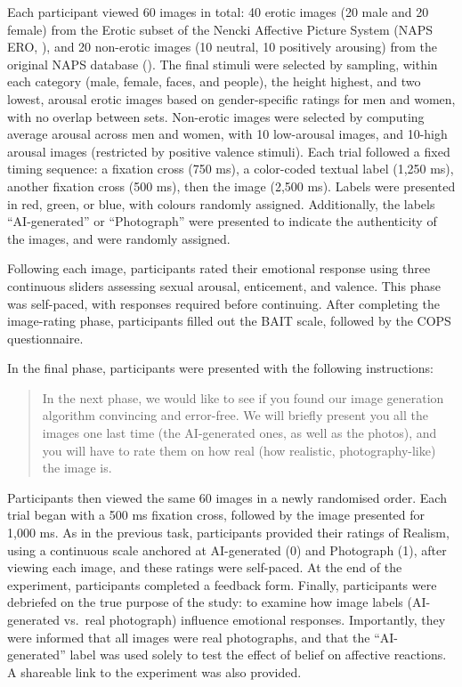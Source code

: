 \documentclass[
  jou,
  floatsintext,
  longtable,
  nolmodern,
  notxfonts,
  notimes,
  colorlinks=true,linkcolor=blue,citecolor=blue,urlcolor=blue]{apa7}
\begin{document}
Each participant viewed 60 images in total: 40 erotic images (20 male
and 20 female) from the Erotic subset of the Nencki Affective Picture
System (NAPS ERO, ), and 20 non-erotic images (10 neutral, 10 positively arousing)
from the original NAPS database
(). The final
stimuli were selected by sampling, within each category (male, female,
faces, and people), the height highest, and two lowest, arousal erotic
images based on gender-specific ratings for men and women, with no
overlap between sets. Non-erotic images were selected by computing
average arousal across men and women, with 10 low-arousal images, and
10-high arousal images (restricted by positive valence stimuli). Each
trial followed a fixed timing sequence: a fixation cross (750 ms), a
color-coded textual label (1,250 ms), another fixation cross (500 ms),
then the image (2,500 ms). Labels were presented in red, green, or blue,
with colours randomly assigned. Additionally, the labels
``AI-generated'' or ``Photograph'' were presented to indicate the
authenticity of the images, and were randomly assigned.

Following each image, participants rated their emotional response using
three continuous sliders assessing sexual arousal, enticement, and
valence. This phase was self-paced, with responses required before
continuing. After completing the image-rating phase, participants filled
out the BAIT scale, followed by the COPS questionnaire.

In the final phase, participants were presented with the following
instructions:

\begin{quote}
In the next phase, we would like to see if you found our image
generation algorithm convincing and error-free. We will briefly present
you all the images one last time (the AI-generated ones, as well as the
photos), and you will have to rate them on how real (how realistic,
photography-like) the image is.
\end{quote}

Participants then viewed the same 60 images in a newly randomised order.
Each trial began with a 500 ms fixation cross, followed by the image
presented for 1,000 ms. As in the previous task, participants provided
their ratings of Realism, using a continuous scale anchored at
AI-generated (0) and Photograph (1), after viewing each image, and these
ratings were self-paced. At the end of the experiment, participants
completed a feedback form. Finally, participants were debriefed on the
true purpose of the study: to examine how image labels (AI-generated
vs.~real photograph) influence emotional responses. Importantly, they
were informed that all images were real photographs, and that the
``AI-generated'' label was used solely to test the effect of belief on
affective reactions. A shareable link to the experiment was also
provided.
\end{document}
